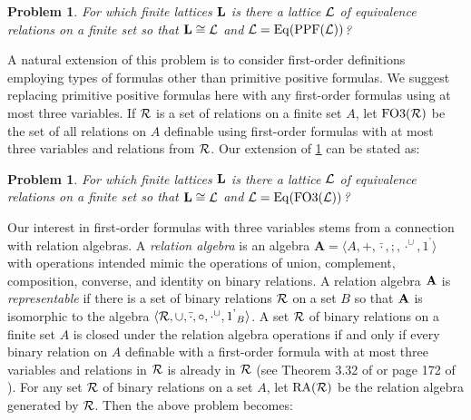 \documentclass[12pt]{au}
\newtheorem{prb}[thm]{Problem}
\begin{document}
\begin{prb} \label{PPFP}
For which finite lattices ${{\mathbf{\uppercase{l}}}}$ is there a lattice ${{\mathcal{\uppercase {l}}}}$ of equivalence relations on a finite set so that ${{\mathbf{\uppercase{l}}}} \cong {{\mathcal{\uppercase {l}}}}$ and ${{\mathcal{\uppercase {l}}}}=  {{\rm Eq}}({{\rm PPF}}({{\mathcal{\uppercase {L}}}}))$?
\end{prb}

A natural extension of this problem is to consider first-order definitions employing types of formulas other than primitive positive formulas.  We suggest replacing primitive positive formulas here with any first-order formulas using at most three variables.  If ${{\mathcal{\uppercase {R}}}}$ is a set of relations on a finite set $A$, let ${{\rm FO3}}({{\mathcal{\uppercase {R}}}})$ be the set of all relations on $A$ definable using first-order formulas with at most three variables and relations from ${{\mathcal{\uppercase {R}}}}$.  Our extension of \ref{PPFP} can be stated as:

\begin{prb} \label{FO3P}
For which finite lattices ${{\mathbf{\uppercase{l}}}}$ is there a lattice ${{\mathcal{\uppercase {l}}}}$ of equivalence relations on a finite set so that ${{\mathbf{\uppercase{l}}}} \cong {{\mathcal{\uppercase {l}}}}$ and ${{\mathcal{\uppercase {l}}}} = {{\rm Eq}}({{\rm FO3}}({{\mathcal{\uppercase {L}}}}))$?
\end{prb}

Our interest in first-order formulas with three variables stems from
a connection with relation algebras.  A {\it relation algebra} is an
algebra $\mathbf{A}=\langle A,+,\bar{\cdot},;,\cdot^{\cup},{1^\text{'}}\rangle$ with  operations intended mimic the
operations of union, complement, composition,  converse, and identity
on binary relations.  A relation algebra ${{\mathbf{\uppercase{a}}}}$ is {\it
representable} if there is a set of binary relations ${{\mathcal{\uppercase {R}}}}$ on a
set $B$ so that ${{\mathbf{\uppercase{a}}}}$ is isomorphic to the algebra $\langle {{\mathcal{\uppercase {R}}}},
\cup, \bar{\cdot}, \circ, \cdot^{\cup}, {1^\text{'}}_B\rangle$.  A set ${{\mathcal{\uppercase {R}}}}$ of binary
relations on a finite set $A$ is closed under the relation algebra
operations if and only if every binary relation on $A$ definable
with a first-order formula with at most three variables and
relations in ${{\mathcal{\uppercase {R}}}}$ is already in ${{\mathcal{\uppercase {R}}}}$ (see Theorem 3.32 of
\cite{games} or page 172 of \cite{thebook}).  For any set ${{\mathcal{\uppercase {R}}}}$ of
binary relations on a set $A$, let ${{\rm RA}} ({{\mathcal{\uppercase {R}}}})$ be the relation
algebra generated by ${{\mathcal{\uppercase {R}}}}$.  Then the above problem becomes:
\end{document}
